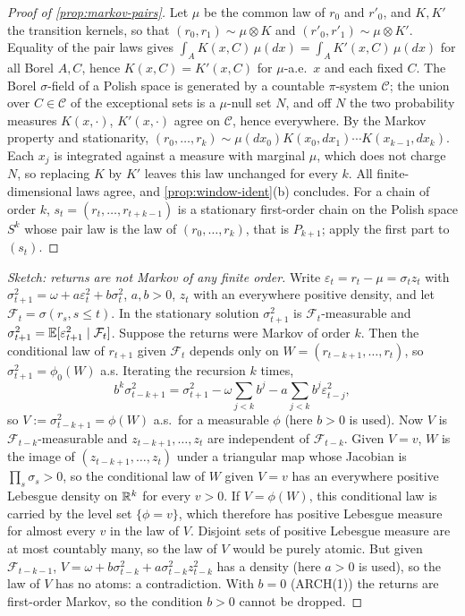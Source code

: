 \begin{proof}[Proof of \cref{prop:markov-pairs}]
Let $\mu$ be the common law of $r_0$ and $r'_0$, and $K,K'$ the transition kernels, so that
$(r_0,r_1)\sim\mu\otimes K$ and $(r'_0,r'_1)\sim\mu\otimes K'$. Equality of the pair laws gives
$\int_AK(x,C)\,\mu(dx)=\int_AK'(x,C)\,\mu(dx)$ for all Borel $A,C$, hence $K(x,C)=K'(x,C)$ for
$\mu$-a.e.\ $x$ and each fixed $C$. The Borel $\sigma$-field of a Polish space is generated by a
countable $\pi$-system $\mathcal C$; the union over $C\in\mathcal C$ of the exceptional sets is a
$\mu$-null set $N$, and off $N$ the two probability measures $K(x,\cdot)$, $K'(x,\cdot)$ agree on
$\mathcal C$, hence everywhere. By the Markov property and stationarity,
$(r_0,\dots,r_k)\sim\mu(dx_0)K(x_0,dx_1)\cdots K(x_{k-1},dx_k)$. Each $x_j$ is integrated
against a measure with marginal $\mu$, which does not charge $N$, so replacing $K$ by $K'$ leaves
this law unchanged for every $k$. All finite-dimensional laws agree, and \cref{prop:window-ident}(b)
concludes. For a chain of order $k$, $s_t=(r_t,\dots,r_{t+k-1})$ is a stationary first-order
chain on the Polish space $S^k$ whose pair law is the law of $(r_0,\dots,r_k)$, that is
$P_{k+1}$; apply the first part to $(s_t)$.
\end{proof}

\begin{proof}[Sketch: \GARCHt{} returns are not Markov of any finite order]
Write $\varepsilon_t=r_t-\mu=\sigma_tz_t$ with $\sigma_{t+1}^2=\omega+a\varepsilon_t^2+b\sigma_t^2$,
$a,b>0$, $z_t$ \iid{} with an everywhere positive density, and let $\mathcal F_t=\sigma(r_s,s\le t)$.
In the stationary solution $\sigma_{t+1}^2$ is $\mathcal F_t$-measurable and
$\sigma_{t+1}^2=\mathbb{E}[\varepsilon_{t+1}^2\mid\mathcal F_t]$. Suppose the returns were Markov of order
$k$. Then the conditional law of $r_{t+1}$ given $\mathcal F_t$ depends only on
$W=(r_{t-k+1},\dots,r_t)$, so $\sigma_{t+1}^2=\phi_0(W)$ a.s. Iterating the recursion $k$ times,
\[
  b^k\sigma_{t-k+1}^2=\sigma_{t+1}^2-\omega\sum_{j<k}b^j-a\sum_{j<k}b^j\varepsilon_{t-j}^2 ,
\]
so $V:=\sigma_{t-k+1}^2=\phi(W)$ a.s.\ for a measurable $\phi$ (here $b>0$ is used). Now $V$ is
$\mathcal F_{t-k}$-measurable and $z_{t-k+1},\dots,z_t$ are independent of $\mathcal F_{t-k}$.
Given $V=v$, $W$ is the image of $(z_{t-k+1},\dots,z_t)$ under a triangular map whose Jacobian is
$\prod_s\sigma_s>0$, so the conditional law of $W$ given $V=v$ has an everywhere positive Lebesgue
density on $\mathbb{R}^k$ for every $v>0$. If $V=\phi(W)$, this conditional law is carried by the level
set $\{\phi=v\}$, which therefore has positive Lebesgue measure for almost every $v$ in the law
of $V$. Disjoint sets of positive Lebesgue measure are at most countably many, so the law of $V$
would be purely atomic. But given $\mathcal F_{t-k-1}$, $V=\omega+b\sigma_{t-k}^2+a\sigma_{t-k}^2z_{t-k}^2$
has a density (here $a>0$ is used), so the law of $V$ has no atoms: a contradiction. With $b=0$
(ARCH(1)) the returns are first-order Markov, so the condition $b>0$ cannot be dropped.
\end{proof}

